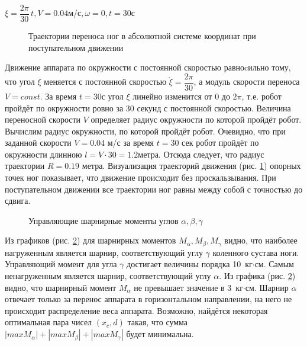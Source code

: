 \begin{center}
$\xi = \dfrac{2\pi}{30}\,t, V = 0.04$м/с$, \omega = 0, t = 30$с
\end{center}

 \begin{figure}[h]
\caption{Траектории переноса ног в абсолютной системе координат при поступательном движении}
\label{fig:exper1}
\end{figure}

Движение аппарата по окружности с постоянной скоростью равноcильно тому, что угол $\xi$ меняется с постоянной скоростью $\dot{\xi} = \dfrac{2\pi}{30}$, а модуль скорости переноса $V=const$. За время $t=30$с угол $\xi$ линейно изменится от 0 до $2\pi$, т.е. робот пройдёт по окружности ровно за 30 секунд с постоянной скоростью. Величина переносной скорости $V$ определяет радиус окружности по которой пройдёт робот. Вычислим радиус окружности, по которой пройдёт робот. Очевидно, что при заданной скорости $V=0.04$ м/с за время $t=30$ сек робот пройдёт по окружности длинною $l = V\cdot30 = 1.2$метра. Отсюда следует, что радиус траектории $R = 0.19$ метра.
Визуализация траекторий движения (рис. \ref{fig:exper1}) опорных точек ног показывает, что движение происходит без проскальзывания. При поступательном движении все траектории ног равны между собой с точностью до сдвига.

\begin{figure}[t]
\caption{Управляющие шарнирные моменты углов $\alpha, \beta, \gamma$}
\label{fig:exper1moments}
\end{figure}

Из графиков (рис. \ref{fig:exper1moments}) для шарнирных моментов $M_\alpha, M_\beta, M_\gamma$ видно, что наиболее нагруженным является шарнир, соответствующий углу $\gamma$ коленного сустава ноги. Управляющий момент для угла $\gamma$ достигает величины порядка 10~кг$\cdot$см. Самым ненагруженным является шарнир, соответствующий углу $\alpha$. Из графика (рис. \ref{fig:exper1moments}) видно, что шарнирный момент $M_\alpha$ не превышает значение в 3~кг$\cdot$см. Шарнир $\alpha$ отвечает только за перенос аппарата в горизонтальном направлении, на него не происходит распределение веса аппарата.
Возможно, найдётся некоторая оптимальная пара чисел $(x_c, d)$ такая, что сумма $|max M_{\alpha}|+|max M_{\beta}|+|max M_{\gamma}|$ будет минимальна.

